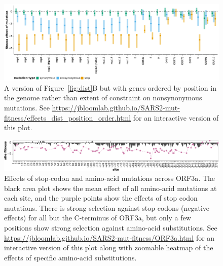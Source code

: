 \documentclass[9pt,twocolumn,twoside]{gsajnl_modified}
\begin{document}
\begin{figure}
\includegraphics[width=\linewidth]{figs/effects_dist_position_order.pdf}
\caption{
A version of Figure~\ref{fig:dist}B but with genes ordered by position in the genome rather than extent of constraint on nonsynonymous mutations.
See \url{https://jbloomlab.github.io/SARS2-mut-fitness/effects_dist_position_order.html} for an interactive version of this plot.
\label{fig:effects_dist_position_order}
}
\end{figure}


\begin{figure}[h]
\includegraphics[width=\linewidth]{figs/ORF3a.pdf}
\caption{
Effects of stop-codon and amino-acid mutations across ORF3a.
The black area plot shows the mean effect of all amino-acid mutations at each site, and the purple points show the effects of stop codon mutations.
There is strong selection against stop codons (negative effects) for all but the C-terminus of ORF3a, but only a few positions show strong selection against amino-acid substitutions.
See \url{https://jbloomlab.github.io/SARS2-mut-fitness/ORF3a.html} for an interactive version of this plot along with zoomable heatmap of the effects of specific amino-acid substitutions.
\label{fig:ORF3a}
}
\end{figure}
\end{document}
